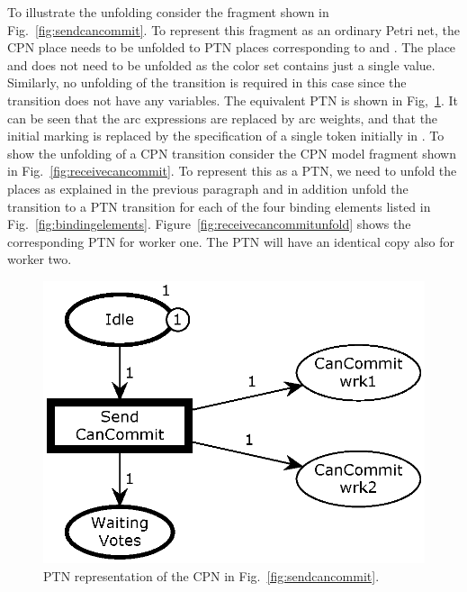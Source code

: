 To illustrate the unfolding consider the fragment shown in
Fig.~\ref{fig:sendcancommit}. To represent this fragment as an
ordinary Petri net, the CPN place  needs to be
unfolded to PTN places corresponding to  and
. The place  and 
does not need to be unfolded as the  color set contains
just a single value. Similarly, no unfolding of the
 transition is required in this case since the
transition does not have any variables. The equivalent PTN is shown in
Fig,~\ref{fig:sendcancommitunfold}. It can be seen that the arc
expressions are replaced by arc weights, and that the initial marking
is replaced by the specification of a single token initially in
. To show the unfolding of a CPN transition consider the
CPN model fragment shown in Fig.~\ref{fig:receivecancommit}. To
represent this as a PTN, we need to unfold the places as explained in
the previous paragraph and in addition unfold the transition
 to a PTN transition for each of the four
binding elements listed in
Fig.~\ref{fig:bindingelements}. Figure~\ref{fig:receivecancommitunfold}
shows the corresponding PTN for worker one. The PTN will have an
identical copy also for worker two.



\begin{figure}[b]
\centering
\includegraphics[scale=.45]{figures/PTSendCanCommit.eps}
\caption{PTN representation of the CPN in Fig.~\ref{fig:sendcancommit}.}
\label{fig:sendcancommitunfold}
\end{figure}


